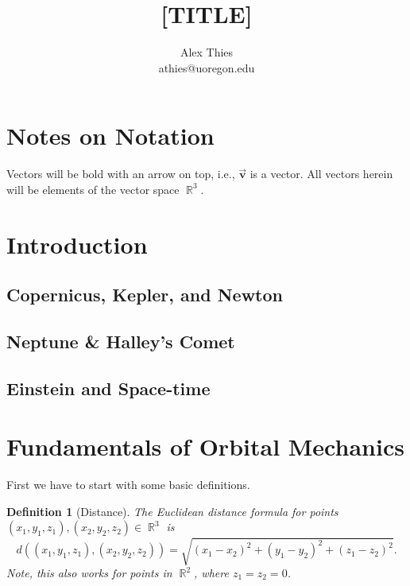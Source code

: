 \documentclass[letterpaper, 12pt]{amsart}
\DeclareMathOperator{\R}{\mathbb{R}}				%
\newcommand{\bvec}[1]{{\vec{\mathbf{#1}}}}			%
\newtheorem{defn}[thm]{Definition}					%
\theoremstyle{definition}  							%
\begin{document}
	\title{[TITLE]}
	\author{Alex Thies \\ \lowercase{athies@uoregon.edu}}

	\maketitle
	\newpage

	\tableofcontents
	\newpage

	\section*{Notes on Notation}
	\label{sec:notes_on_notation}
	Vectors will be bold with an arrow on top, i.e., $\bvec{v}$ is a vector.
	All vectors herein will be elements of the vector space $\R^3$.
	\newpage

	\section{Introduction}
		\subsection{Copernicus, Kepler, and Newton}
		\label{sub:copernicus_kepler_and_newton}

		\subsection{Neptune \& Halley's Comet}
		\label{sub:neptune_&_halley_s_comet}

		\subsection{Einstein and Space-time}
		\label{sub:einstein_and_space_time}
	\label{sec:introduction}
	\newpage

	\section{Fundamentals of Orbital Mechanics}
	\label{sec:fundamentals_of_orbital_mechanics}
		First we have to start with some basic definitions.

		\begin{defn}[Distance]
			The Euclidean distance formula for points $(x_{1},y_{1},z_{1}),(x_{2},y_{2},z_{2}) \in \R^3$ is $$d((x_{1},y_{1},z_{1}),(x_{2},y_{2},z_{2})) = \sqrt{(x_{1} - x_{2})^2 + (y_{1} - y_{2})^2 + (z_{1} - z_{2})^2}.$$
			Note, this also works for points in $\R^2$, where $z_{1} = z_{2} = 0$.
		\end{defn}
\end{document}
